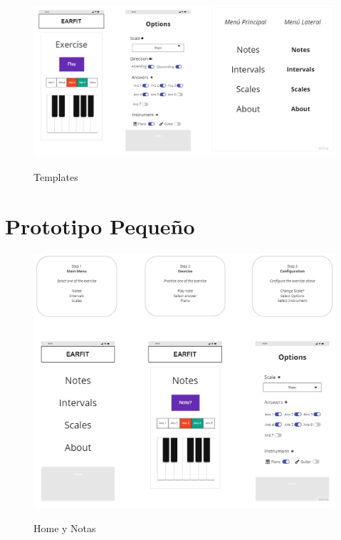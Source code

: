 \documentclass[12pt,twoside,titlepage]{report}
\begin{document}
\begin{figure}[H]
    \centering
    \includegraphics[scale=0.28]{Design Thinking/Prototipo/Small/Templates}
    \label{fig:Templates}
    \caption{Templates}
\end{figure}

\section{Prototipo Pequeño}

\begin{figure}[H]
    \centering
    \includegraphics[scale=0.35]{Design Thinking/Prototipo/Small/Prototipo}
    \label{fig:Prototipo1}
    \caption{Home y Notas}
\end{figure}
\end{document}
